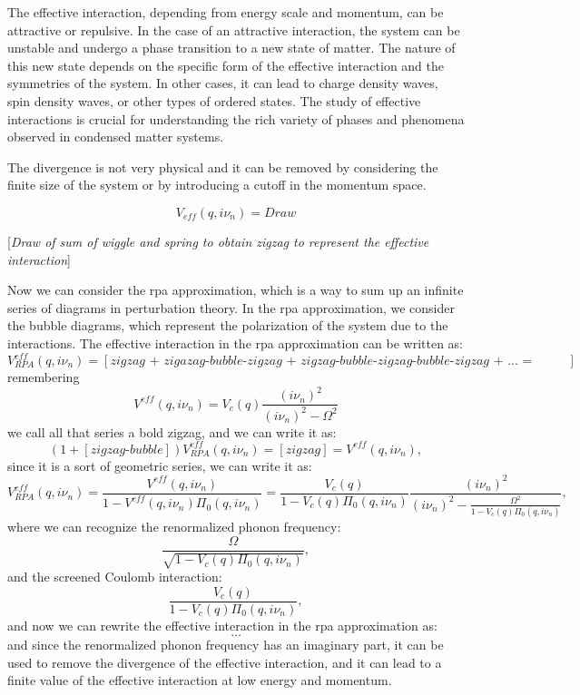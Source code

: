 The effective interaction, depending from energy scale and momentum, can be attractive or repulsive. In the case of an attractive interaction, the system can be unstable and undergo a phase transition to a new state of matter. The nature of this new state depends on the specific form of the effective interaction and the symmetries of the system. In other cases, it can lead to charge density waves, spin density waves, or other types of ordered states. The study of effective interactions is crucial for understanding the rich variety of phases and phenomena observed in condensed matter systems.

The divergence is not very physical and it can be removed by considering the finite size of the system or by introducing a cutoff in the momentum space.

\[
    V_{eff}(q,i \nu_n) = Draw
\]

[\textit{Draw of sum of wiggle and spring to obtain zigzag to represent the effective interaction}]

Now we can consider the rpa approximation, which is a way to sum up an infinite series of diagrams in perturbation theory. In the rpa approximation, we consider the bubble diagrams, which represent the polarization of the system due to the interactions. The effective interaction in the rpa approximation can be written as:
\[
    V^{eff}_{RPA}(q,i \nu_n) = [\textit{zigzag + zigazag-bubble-zigzag + zigzag-bubble-zigzag-bubble-zigzag + ... = boldzigzag}]
\]
remembering
\[
    V^{eff}(q,i \nu_n) = V_c(q) \frac{(i \nu_n)^2}{(i \nu_n)^2 - \Omega^2}
\]
we call all that series a bold zigzag, and we can write it as:
\[
    \left(1 + [\textit{zigzag-bubble}]\right)V_{RPA}^{eff}(q,i \nu_n) = [\textit{zigzag}] = V^{eff}(q,i \nu_n),
\]
since it is a sort of geometric series, we can write it as:
\[
    V^{eff}_{RPA}(q,i \nu_n) = \frac{V^{eff}(q,i \nu_n)}{1 - V^{eff}(q,i \nu_n) \Pi_0(q,i \nu_n)} = \frac{V_c(q)}{1-V_c(q) \Pi_0(q,i \nu_n)}\frac{(i \nu_n)^2}{(i \nu_n)^2 - \frac{\Omega^2}{1-V_c(q) \Pi_0(q,i \nu_n)}},
\]
where we can recognize the renormalized phonon frequency:
\[
    \frac{\Omega}{\sqrt{1 - V_c(q) \Pi_0(q,i \nu_n)}},
\]
and the screened Coulomb interaction:
\[
    \frac{V_c(q)}{1 - V_c(q)\Pi_0(q,i \nu_n)},
\]
and now we can rewrite the effective interaction in the rpa approximation as:
\[
    \dots
\]
and since the renormalized phonon frequency has an imaginary part, it can be used to remove the divergence of the effective interaction, and it can lead to a finite value of the effective interaction at low energy and momentum.

